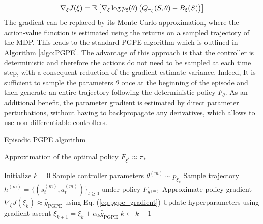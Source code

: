 \begin{equation}
	\nabla_\xi J(\xi) = \mathbb{E}_{}\left[ \nabla_\xi \log p_\xi(\theta) \left(Q_{\pi_\xi}(S,
						\theta) - B_\xi(S)\right) \right]
\end{equation}
The gradient can be replaced by its Monte Carlo approximation, where the action-value function is estimated using the returns on a sampled trajectory of the MDP. This leads to the standard PGPE algorithm which is outlined in Algorithm \ref{algo:PGPE}. The advantage of this approach is that the controller is deterministic and therefore the actions do not need to be sampled at each time step, with a consequent reduction of the gradient estimate variance. Indeed, It is sufficient to sample the parameters $\theta$ once at the beginning of the episode and then generate an entire trajectory following the deterministic policy $F_\theta$. As an additional benefit, the parameter gradient is
estimated by direct parameter perturbations, without having to backpropagate
any derivatives, which allows to use non-differentiable controllers.\\

\begin{algorithm}[t]
	\caption{Episodic PGPE algorithm}
	\label{algo:PGPE}
	\begin{algorithmic}[0]
		\Ensure Approximation of the optimal policy $F_{\xi^*} \approx \pi_*$
		\begin{algorithmic}[1]
			\State Initialize $k = 0$
			\Repeat
					\State Sample controller parameters $\theta^{(m)} \sim p_{\xi_k}$ 
					\State Sample trajectory $h^{(m)} = \{(s_t^{(m)}, a_t^{(m)})\}_{t \geq 0}$ under policy $F_{\theta^{(m)}}$
				\EndFor
				\State Approximate policy gradient $\nabla_\xi J(\xi_k) \approx \widehat{g}_\text{PGPE}$ using Eq. (\ref{eq:pgpe_gradient})
				\State Update hyperparameters using gradient ascent $\xi_{k+1} = \xi_k + \alpha_k \widehat{g}_\text{PGPE}$
				\State $k \leftarrow k + 1$
		\end{algorithmic}
	\end{algorithmic}
\end{algorithm}

